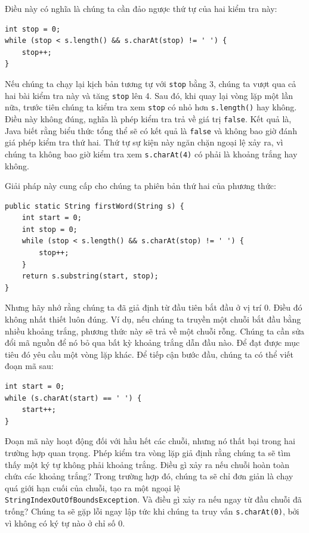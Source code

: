 Điều này có nghĩa là chúng ta cần đảo ngược thứ tự của hai kiểm tra này:

\begin{verbatim}
int stop = 0;
while (stop < s.length() && s.charAt(stop) != ' ') {
    stop++;
}
\end{verbatim}

Nếu chúng ta chạy lại kịch bản tương tự với \texttt{stop} bằng 3, chúng ta vượt qua cả hai bài kiểm tra này và tăng \texttt{stop} lên 4. Sau đó, khi quay lại vòng lặp một lần nữa, trước tiên chúng ta kiểm tra xem \texttt{stop} có nhỏ hơn \texttt{s.length()} hay không. Điều này không đúng, nghĩa là phép kiểm tra trả về giá trị \texttt{false}. Kết quả là, Java biết rằng biểu thức tổng thể sẽ có kết quả là \texttt{false} và không bao giờ đánh giá phép kiểm tra thứ hai. Thứ tự sự kiện này ngăn chặn ngoại lệ xảy ra, vì chúng ta không bao giờ kiểm tra xem \texttt{s.charAt(4)} có phải là khoảng trắng hay không.

Giải pháp này cung cấp cho chúng ta phiên bản thứ hai của phương thức:

\begin{verbatim}
public static String firstWord(String s) {
    int start = 0;
    int stop = 0;
    while (stop < s.length() && s.charAt(stop) != ' ') {
        stop++;
    }
    return s.substring(start, stop);
}
\end{verbatim}

Nhưng hãy nhớ rằng chúng ta đã giả định từ đầu tiên bắt đầu ở vị trí 0. Điều đó không nhất thiết luôn đúng. Ví dụ, nếu chúng ta truyền một chuỗi bắt đầu bằng nhiều khoảng trắng, phương thức này sẽ trả về một chuỗi rỗng. Chúng ta cần sửa đổi mã nguồn để nó bỏ qua bất kỳ khoảng trắng dẫn đầu nào. Để đạt được mục tiêu đó yêu cầu một vòng lặp khác. Để tiếp cận bước đầu, chúng ta có thể viết đoạn mã sau:

\begin{verbatim}
int start = 0;
while (s.charAt(start) == ' ') {
    start++;
}
\end{verbatim}

Đoạn mã này hoạt động đối với hầu hết các chuỗi, nhưng nó thất bại trong hai trường hợp quan trọng. Phép kiểm tra vòng lặp giả định rằng chúng ta sẽ tìm thấy một ký tự không phải khoảng trắng. Điều gì xảy ra nếu chuỗi hoàn toàn chứa các khoảng trắng? Trong trường hợp đó, chúng ta sẽ chỉ đơn giản là chạy quá giới hạn cuối của chuỗi, tạo ra một ngoại lệ \texttt{StringIndex\allowbreak{}OutOfBounds\allowbreak{}Exception}. Và điều gì xảy ra nếu ngay từ đầu chuỗi đã trống? Chúng ta sẽ gặp lỗi ngay lập tức khi chúng ta truy vấn \texttt{s.charAt(0)}, bởi vì không có ký tự nào ở chỉ số 0.

